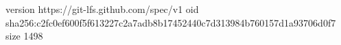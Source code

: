 version https://git-lfs.github.com/spec/v1
oid sha256:c2fc0ef600f5f613227c2a7adb8b17452440c7d313984b760157d1a93706d0f7
size 1498
